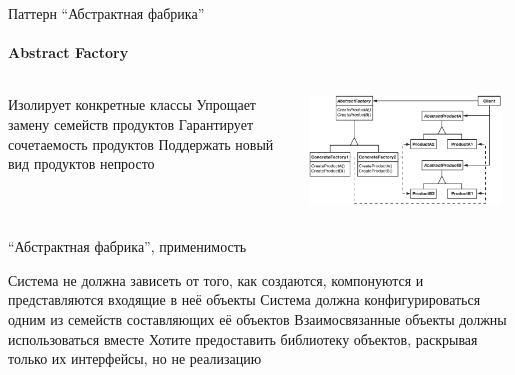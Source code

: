 \documentclass{../../slides-style}
\begin{document}
    \begin{frame}{Паттерн \enquote{Абстрактная фабрика}}
        \framesubtitle{Abstract Factory}
        \begin{columns}
            \begin{column}{0.4\textwidth}
                \begin{outline}
                    \1 Изолирует конкретные классы
                    \1 Упрощает замену семейств продуктов
                    \1 Гарантирует сочетаемость продуктов
                    \1 Поддержать новый вид продуктов непросто
                \end{outline}
            \end{column}
            \begin{column}{0.6\textwidth}
                \begin{center}
                    \includegraphics[width=0.95\textwidth]{abstractFactory.png}
                \end{center}
            \end{column}
        \end{columns}
    \end{frame}

    \begin{frame}{\enquote{Абстрактная фабрика}, применимость}
        \begin{outline}
            \1 Система не должна зависеть от того, как создаются, компонуются и представляются входящие в неё объекты
            \1 Система должна конфигурироваться одним из семейств составляющих её объектов
            \1 Взаимосвязанные объекты должны использоваться вместе
            \1 Хотите предоставить библиотеку объектов, раскрывая только их интерфейсы, но не реализацию
        \end{outline}
    \end{frame}
\end{document}
